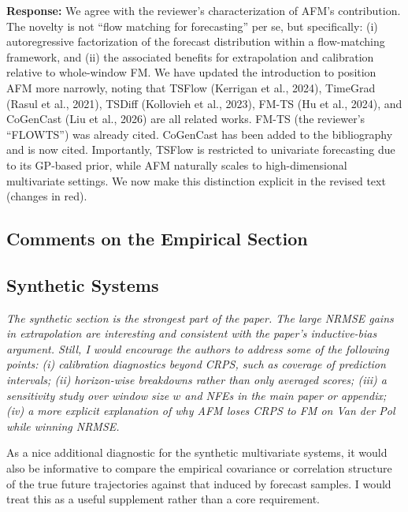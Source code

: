 \documentclass[11pt]{article}
\newcommand{\reviewertext}[1]{%
  \begin{reviewerquote}
    {\color{reviewercolor}\itshape #1}
  \end{reviewerquote}%
}
\newcommand{\authorresponse}[1]{%
  \textbf{Response:} #1\par\medskip
}
\begin{document}
\authorresponse{%
We agree with the reviewer's characterization of AFM's contribution. The novelty is not ``flow matching for forecasting'' per se, but specifically: (i) autoregressive factorization of the forecast distribution within a flow-matching framework, and (ii) the associated benefits for extrapolation and calibration relative to whole-window FM. We have updated the introduction to position AFM more narrowly, noting that TSFlow (Kerrigan et al., 2024), TimeGrad (Rasul et al., 2021), TSDiff (Kollovieh et al., 2023), FM-TS (Hu et al., 2024), and CoGenCast (Liu et al., 2026) are all related works. FM-TS (the reviewer's ``FLOWTS'') was already cited.  CoGenCast has been added to the bibliography and is now cited. Importantly, TSFlow is restricted to univariate forecasting due to its GP-based prior, while AFM naturally scales to high-dimensional multivariate settings. We now make this distinction explicit in the revised text (changes in red).
}

\subsection{Comments on the Empirical Section}

\subsection{Synthetic Systems}

\reviewertext{%
The synthetic section is the strongest part of the paper. The large NRMSE gains in extrapolation are interesting and consistent with the paper's inductive-bias argument. Still, I would encourage the authors to address some of the following points: (i) calibration diagnostics beyond CRPS, such as coverage of prediction intervals; (ii) horizon-wise breakdowns rather than only averaged scores; (iii) a sensitivity study over window size $w$ and NFEs in the main paper or appendix; (iv) a more explicit explanation of why AFM loses CRPS to FM on Van der Pol while winning NRMSE.

As a nice additional diagnostic for the synthetic multivariate systems, it would also be informative to compare the empirical covariance or correlation structure of the true future trajectories against that induced by forecast samples. I would treat this as a useful supplement rather than a core requirement.
}
\end{document}
